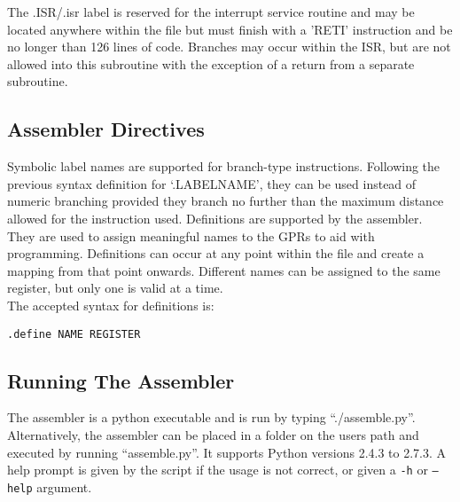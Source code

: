 \noindent The .ISR/.isr label is reserved for the interrupt service routine and may be located anywhere within the file but must finish with a 'RETI' instruction and be no longer than 126 lines of code. Branches may occur within the ISR, but are not allowed into this subroutine with the exception of a return from a separate subroutine.\\

\subsection{Assembler Directives}
Symbolic label names are supported for branch-type instructions. Following the previous syntax definition for `.LABELNAME', they can be used instead of numeric branching provided they branch no further than the maximum distance allowed for the instruction used. 
Definitions are supported by the assembler. 
They are used to assign meaningful names to the GPRs to aid with programming.
Definitions can occur at any point within the file and create a mapping from that point onwards. 
Different names can be assigned to the same register, but only one is valid at a time. \\


\noindent The accepted syntax for definitions is:

\begin{center}\texttt{.define NAME REGISTER}\end{center}

\subsection{Running The Assembler}

The assembler is a python executable and is run by typing ``./assemble.py''. 
Alternatively, the assembler can be placed in a folder on the users path and executed by running ``assemble.py''.
It supports Python versions 2.4.3 to 2.7.3.
A help prompt is given by the script if the usage is not correct, or given a \texttt{-h} or \texttt{--help} argument. 

